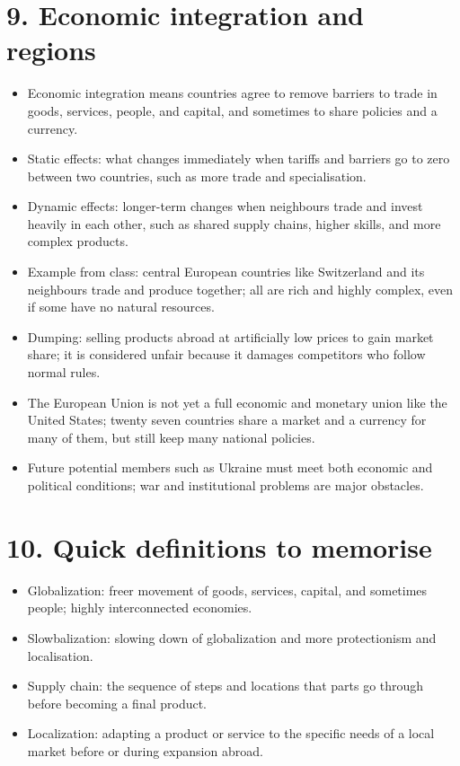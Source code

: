 \documentclass[10pt,a4paper]{article}
\begin{document}
\section*{9. Economic integration and regions}
\begin{itemize}
\item Economic integration means countries agree to remove barriers to trade in goods, services, people, and capital, and sometimes to share policies and a currency.
\item Static effects: what changes immediately when tariffs and barriers go to zero between two countries, such as more trade and specialisation.
\item Dynamic effects: longer-term changes when neighbours trade and invest heavily in each other, such as shared supply chains, higher skills, and more complex products.
\item Example from class: central European countries like Switzerland and its neighbours trade and produce together; all are rich and highly complex, even if some have no natural resources.
\item Dumping: selling products abroad at artificially low prices to gain market share; it is considered unfair because it damages competitors who follow normal rules.
\item The European Union is not yet a full economic and monetary union like the United States; twenty seven countries share a market and a currency for many of them, but still keep many national policies.
\item Future potential members such as Ukraine must meet both economic and political conditions; war and institutional problems are major obstacles.
\end{itemize}

\section*{10. Quick definitions to memorise}
\begin{itemize}
\item Globalization: freer movement of goods, services, capital, and sometimes people; highly interconnected economies.
\item Slowbalization: slowing down of globalization and more protectionism and localisation.
\item Supply chain: the sequence of steps and locations that parts go through before becoming a final product.
\item Localization: adapting a product or service to the specific needs of a local market before or during expansion abroad.
\end{itemize}
\end{document}
